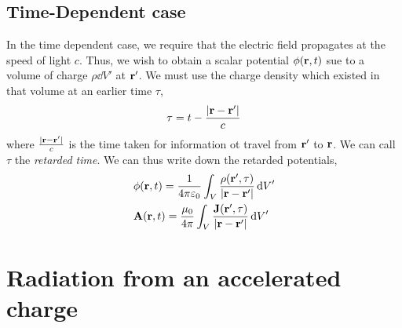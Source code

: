 \documentclass{book}
\begin{document}
\subsection{Time-Dependent case}
In the time dependent case, we require that the electric field propagates at the speed of light $c$. Thus, we wish to obtain a scalar potential $\phi(\vb{r},t)$ sue to a volume of charge $\rho\dd{V}'$ at $\vb{r}'$. We must use the charge density which existed in that volume at an earlier time $\tau$,
\begin{equation}
	\tau = t - \frac{|\vb{r} - \vb{r}'|}{c}
\end{equation}
where $\frac{|\vb{r} - \vb{r}'|}{c}$ is the time taken for information ot travel from $\vb{r}'$ to $\vb{r}$. We can call $\tau$ the \textit{retarded time}. We can thus write down the retarded potentials,
\begin{align}
	&\phi(\vb{r},t) = \frac{1}{4\pi\varepsilon_0}\int_V \frac{\rho(\vb{r}', \tau)}{|\vb{r} - \vb{r}'|}\dd{V}' \\
	&\vb{A}(\vb{r},t) = \frac{\mu_0}{4\pi}\int_V\frac{\vb{J}(\vb{r}',\tau)}{|\vb{r}- \vb{r}'|}\dd{V}'
\end{align}

\section{Radiation from an accelerated charge}
\end{document}
